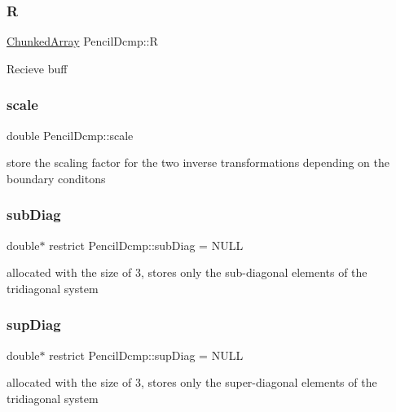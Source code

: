 \subsubsection{\texorpdfstring{R}{R}}
{\footnotesize\ttfamily \mbox{\hyperlink{classChunkedArray}{Chunked\+Array}} Pencil\+Dcmp\+::R\hspace{0.3cm}{\ttfamily [protected]}}

Recieve buff \mbox{\label{classPencilDcmp_a6f614285fa414f35f63d2c6277b39bc0}} 
\subsubsection{\texorpdfstring{scale}{scale}}
{\footnotesize\ttfamily double Pencil\+Dcmp\+::scale\hspace{0.3cm}{\ttfamily [protected]}}

store the scaling factor for the two inverse transformations depending on the boundary conditons \mbox{\label{classPencilDcmp_a551bc9ca5c23d551cf276c966d360399}} 
\subsubsection{\texorpdfstring{sub\+Diag}{subDiag}}
{\footnotesize\ttfamily double$\ast$ restrict Pencil\+Dcmp\+::sub\+Diag = N\+U\+LL\hspace{0.3cm}{\ttfamily [protected]}}

allocated with the size of 3, stores only the sub-\/diagonal elements of the tridiagonal system \mbox{\label{classPencilDcmp_a1207ba2d374b1a9bf6b899d661adac96}} 
\subsubsection{\texorpdfstring{sup\+Diag}{supDiag}}
{\footnotesize\ttfamily double$\ast$ restrict Pencil\+Dcmp\+::sup\+Diag = N\+U\+LL\hspace{0.3cm}{\ttfamily [protected]}}

allocated with the size of 3, stores only the super-\/diagonal elements of the tridiagonal system \mbox{\label{classPencilDcmp_ac6ad56d62e7f4d40db194b15fc7f3660}} 
